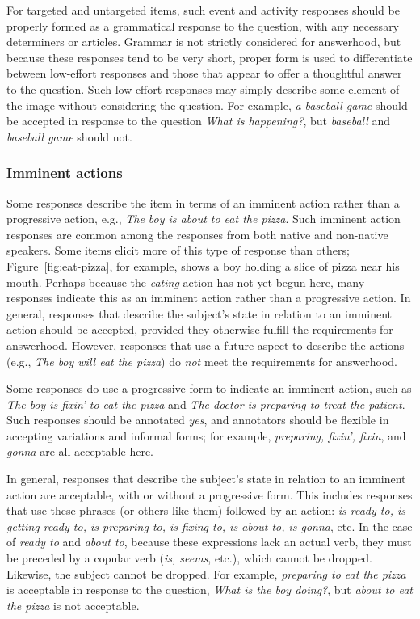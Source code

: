 \documentclass[12pt,notitlepage]{article}
\begin{document}
For targeted and untargeted items, such event and activity responses should be properly formed as a grammatical response to the question, with any necessary determiners or articles. Grammar is not strictly considered for answerhood, but because these responses tend to be very short, proper form is used to differentiate between low-effort responses and those that appear to offer a thoughtful answer to the question. Such low-effort responses may simply describe some element of the image without considering the question. For example, \textit{a baseball game} should be accepted in response to the question \textit{What is happening?}, but \textit{baseball} and \textit{baseball game} should not.

\subsubsection{Imminent actions}
\label{subsubsection:answerhood-imminent}
Some responses describe the item in terms of an imminent action rather than a progressive action, e.g., \textit{The boy is about to eat the pizza}. Such imminent action responses are common among the responses from both native and non-native speakers. Some items elicit more of this type of response than others; Figure~\ref{fig:eat-pizza}, for example, shows a boy holding a slice of pizza near his mouth. Perhaps because the \textit{eating} action has not yet begun here, many responses indicate this as an imminent action rather than a progressive action. In general, responses that describe the subject's state in relation to an imminent action should be accepted, provided they otherwise fulfill the requirements for answerhood. However, responses that use a future aspect to describe the actions (e.g., \textit{The boy will eat the pizza}) do \textit{not} meet the requirements for answerhood.

Some responses do use a progressive form to indicate an imminent action, such as \textit{The boy is fixin' to eat the pizza} and \textit{The doctor is preparing to treat the patient}. Such responses should be annotated \textit{yes}, and annotators should be flexible in accepting variations and informal forms; for example, \textit{preparing, fixin', fixin}, and \textit{gonna} are all acceptable here.

In general, responses that describe the subject's state in relation to an imminent action are acceptable, with or without a progressive form. This includes responses that use these phrases (or others like them) followed by an action: \textit{is ready to, is getting ready to, is preparing to, is fixing to, is about to, is gonna}, etc. In the case of \textit{ready to} and \textit{about to}, because these expressions lack an actual verb, they must be preceded by a copular verb (\textit{is, seems}, etc.), which cannot be dropped. Likewise, the subject cannot be dropped. For example, \textit{preparing to eat the pizza} is acceptable in response to the question, \textit{What is the boy doing?}, but \textit{about to eat the pizza} is not acceptable.
\end{document}
